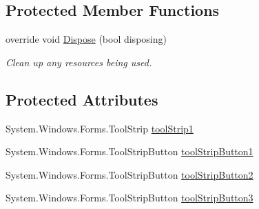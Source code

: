 \subsection*{Protected Member Functions}
\begin{DoxyCompactItemize}
\item 
override void \hyperlink{class__7___doroshenko__forms2__is52_1_1_task__4_a1c7261a0d18d9aff4ab7cb21d13ee353}{Dispose} (bool disposing)
\begin{DoxyCompactList}\small\item\em Clean up any resources being used. \end{DoxyCompactList}\end{DoxyCompactItemize}
\subsection*{Protected Attributes}
\begin{DoxyCompactItemize}
\item 
System.\+Windows.\+Forms.\+Tool\+Strip \hyperlink{class__7___doroshenko__forms2__is52_1_1_task__4_af28d01c97325965670833804cf140b7c}{tool\+Strip1}
\item 
System.\+Windows.\+Forms.\+Tool\+Strip\+Button \hyperlink{class__7___doroshenko__forms2__is52_1_1_task__4_a721d267a0f0cbe4ed424b4ce10b11450}{tool\+Strip\+Button1}
\item 
System.\+Windows.\+Forms.\+Tool\+Strip\+Button \hyperlink{class__7___doroshenko__forms2__is52_1_1_task__4_ad1faf4747462858f47d400adf747df45}{tool\+Strip\+Button2}
\item 
System.\+Windows.\+Forms.\+Tool\+Strip\+Button \hyperlink{class__7___doroshenko__forms2__is52_1_1_task__4_af586497accc2f3831a9b90eaad5d062f}{tool\+Strip\+Button3}
\end{DoxyCompactItemize}
